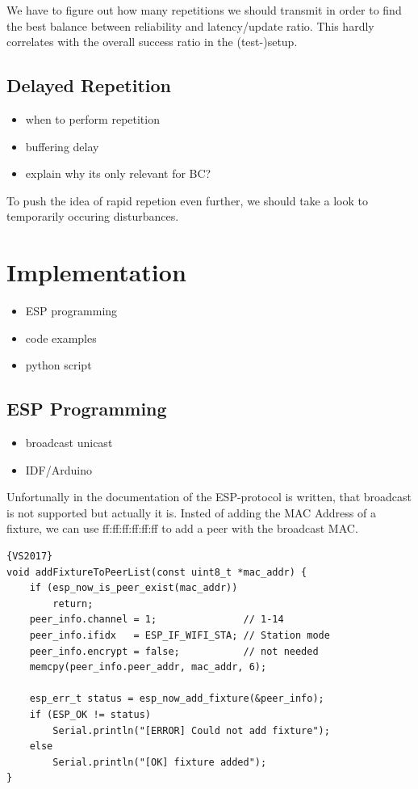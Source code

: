 \documentclass[]{ccs-thesis}
\begin{document}
We have to figure out how many repetitions we should transmit in order to find the best balance between reliability and latency/update ratio.
This hardly correlates with the overall success ratio in the (test-)setup. 

\subsection*{Delayed Repetition}
\label{sub:DelayedRepetition}
\begin{itemize}
\item when to perform repetition
\item buffering delay
\item explain why its only relevant for BC?
\end{itemize}

To push the idea of rapid repetion even further, we should take a look to temporarily occuring disturbances.

\section{Implementation}
\begin{itemize}
\item ESP programming
\item code examples
\item python script
\end{itemize}

\subsection*{ESP Programming}
\begin{itemize}
\item broadcast unicast
\item IDF/Arduino
\end{itemize}
Unfortunally in the documentation of the ESP-protocol is written, that broadcast is not supported 
but actually it is. Insted of adding the \ac{MAC} Address of a fixture, we can use ff:ff:ff:ff:ff:ff 
 to add a peer with the broadcast \ac{MAC}.

\begin{lstlisting}{VS2017} 
void addFixtureToPeerList(const uint8_t *mac_addr) {
	if (esp_now_is_peer_exist(mac_addr)) 
		return;
	peer_info.channel = 1;               // 1-14
	peer_info.ifidx   = ESP_IF_WIFI_STA; // Station mode
	peer_info.encrypt = false;         	 // not needed
	memcpy(peer_info.peer_addr, mac_addr, 6);

	esp_err_t status = esp_now_add_fixture(&peer_info);
	if (ESP_OK != status)
		Serial.println("[ERROR] Could not add fixture");
	else
		Serial.println("[OK] fixture added");
}
\end{lstlisting}
\end{document}
